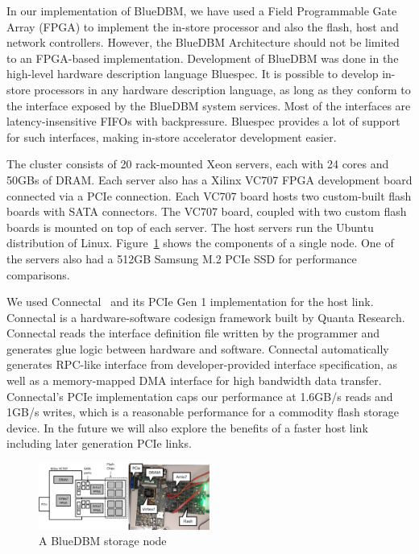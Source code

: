 In our implementation of BlueDBM, we have used a Field Programmable Gate
Array (FPGA) to implement the in-store processor and also the flash, host and
network controllers. However, the BlueDBM Architecture should not be limited
to an FPGA-based implementation.  Development of BlueDBM was done in the
high-level hardware description language Bluespec. It is possible to develop in-store processors in any hardware description language, as long as they conform to the interface exposed by the BlueDBM system services. Most of the interfaces are latency-insensitive FIFOs with backpressure. Bluespec provides a lot of support for such interfaces, making in-store accelerator development easier.

The cluster consists of 20 rack-mounted Xeon servers, each with 24 cores and
50GBs of DRAM. Each server also has a Xilinx
VC707 FPGA development board connected via a PCIe connection. Each VC707 board
hosts two custom-built flash boards with SATA connectors. The VC707 board,
coupled with two custom flash boards is mounted on top of each server.
The host servers run the Ubuntu distribution of Linux.
Figure~\ref{fig:bluedbmnode} shows the components of a single node.
One of the servers also had a 512GB Samsung M.2 PCIe SSD for performance
comparisons.

We used Connectal~\cite{connectal} and its PCIe Gen 1 implementation for the
host link.  Connectal is a hardware-software codesign framework built by Quanta
Research.  Connectal reads the interface definition file written by the
programmer and generates glue logic between hardware and software. Connectal
automatically generates RPC-like interface from developer-provided interface
specification, as well as a memory-mapped DMA interface for high bandwidth data
transfer.  Connectal's PCIe implementation caps our performance at 1.6GB/s reads
and 1GB/s writes, which is a reasonable performance for a commodity flash
storage device. In the future we will also explore the benefits of a faster host
link including later generation PCIe links.

\begin{figure}[ht]
	\begin{center}
	\includegraphics[width=0.5\textwidth]{figures/racknode-crop.pdf}
	\caption{A BlueDBM storage node}
	\label{fig:bluedbmnode}
	\end{center}
\end{figure}


